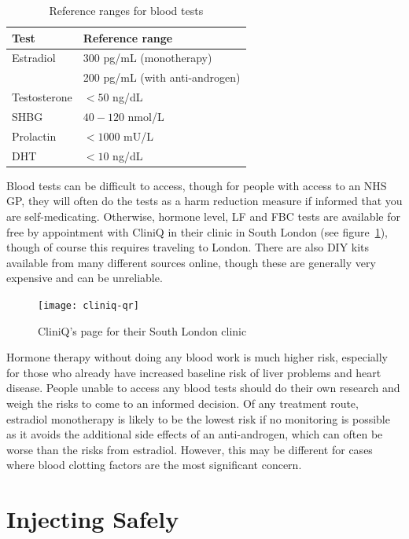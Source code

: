\documentclass[twoside,a5paper]{article}
\begin{document}
\begin{table}
  \centering
  \begin{tabular}{ll}
    \toprule
    Test & Reference range \\
    \midrule
    Estradiol & 300 pg/mL (monotherapy) \\
    & 200 pg/mL (with anti-androgen) \\
    Testosterone & $< 50$ ng/dL \\
    SHBG & $40 - 120$ nmol/L \\
    Prolactin & $< 1000$ mU/L \\
    DHT & $< 10$ ng/dL \\
    \bottomrule
  \end{tabular}
  \caption{Reference ranges for blood tests}
  \label{tab:blood-ranges}
\end{table}

Blood tests can be difficult to access, though for people with access
to an NHS GP, they will often do the tests as a harm reduction measure
if informed that you are self-medicating.  Otherwise, hormone level,
LF and FBC tests are available for free by appointment with CliniQ in
their clinic in South London (see figure~\ref{fig:cliniq-qr}), though
of course this requires traveling to London.  There are also DIY kits
available from many different sources online, though these are
generally very expensive and can be unreliable.

\begin{figure}
  \centering
  \texttt{[image: cliniq-qr]}
  \caption{CliniQ's page for their South London clinic}
  \label{fig:cliniq-qr}
\end{figure}

Hormone therapy without doing any blood work is much higher risk,
especially for those who already have increased baseline risk of liver
problems and heart disease.  People unable to access any blood tests
should do their own research and weigh the risks to come to an
informed decision.  Of any treatment route, estradiol monotherapy is
likely to be the lowest risk if no monitoring is possible as it avoids
the additional side effects of an anti-androgen, which can often be
worse than the risks from estradiol.  However, this may be different
for cases where blood clotting factors are the most significant
concern.

\section{Injecting Safely}
\end{document}

